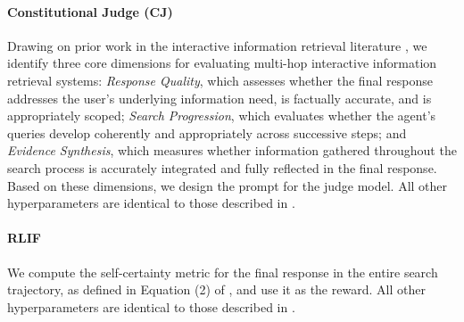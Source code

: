 

\paragraph{Constitutional Judge (CJ)}
Drawing on prior work in the interactive information retrieval literature \citep{borlund2003iir, kelly2009methods, carterette2011system}, we identify three core dimensions for evaluating multi-hop interactive information retrieval systems: \textit{Response Quality}, which assesses whether the final response addresses the user's underlying information need, is factually accurate, and is appropriately scoped; \textit{Search Progression}, which evaluates whether the agent's queries develop coherently and appropriately across successive steps; and \textit{Evidence Synthesis}, which measures whether information gathered throughout the search process is accurately integrated and fully reflected in the final response. Based on these dimensions, we design the prompt for the judge model. All other hyperparameters are identical to those described in .


\paragraph{RLIF}
We compute the self-certainty metric for the final response in the entire search trajectory, as defined in Equation (2) of \citet{rlif}, and use it as the reward. All other hyperparameters are identical to those described in .



